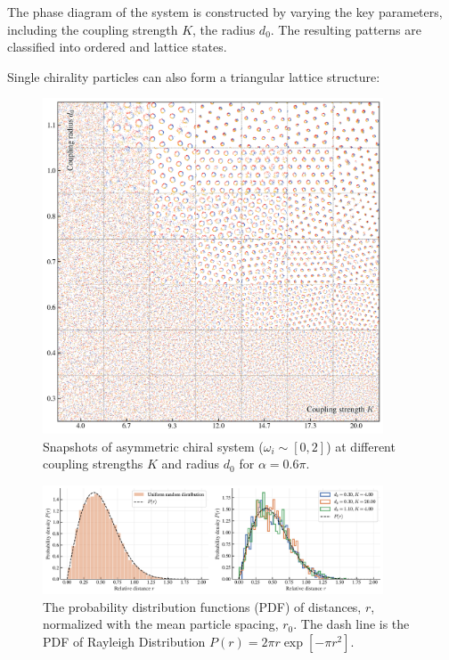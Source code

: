 \documentclass{article}
\begin{document}
\newpage
The phase diagram of the system is constructed by varying the key parameters, including the coupling strength $K$, the radius $d_0$. The resulting patterns are classified into ordered and lattice states. 

Single chirality particles can also form a triangular lattice structure:
\begin{figure}[H]
    \centering
    \includegraphics[width=0.9\textwidth]{./figs/asymmetric.png}
    \caption{
        Snapshots of asymmetric chiral system ($\omega _{i}\sim[0, 2]$) at different coupling strengths $K$ and radius $d_0$ for $\alpha = 0.6\pi$.
    }
\end{figure}
\vspace{-0.5cm}
\begin{figure}[H]
    \centering
    \includegraphics[width=0.9\textwidth]{./figs/uniform.pdf}
    \caption{
        The probability distribution functions (PDF) of distances, $r$, normalized with the mean particle spacing, $r_0$.
        The dash line is the PDF of Rayleigh Distribution $P(r)=2\pi r\exp\left[-\pi r^2\right]$.
    }
\end{figure}
\end{document}
